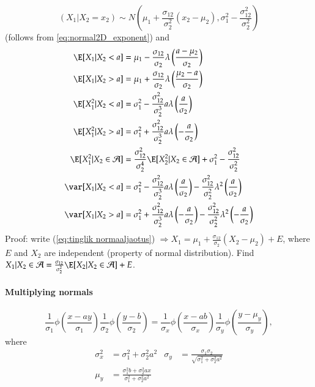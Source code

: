 \documentclass[a4paper]{article}
\numberwithin{equation}{subsection}
\begin{document}
\begin{equation}
  (X_1|X_2 = x_2)
  \sim 
  N\left(\mu_1 + \frac{\sigma_{12}}{\sigma_2^2}(x_2 - \mu_2),
    \sigma_1^2 - \frac{\sigma_{12}^2}{\sigma_2^2}\right)
\label{eq:tinglik normaaljaotus}
\end{equation}
(follows from \ref{eq:normal2D_exponent}) and
\begin{align}
  \E[X_1|X_2 < a] 
  & = 
  \mu_1 - \frac{\sigma_{12}}{\sigma_2}
  \lambda 
  \left( \frac{a - \mu_2}{\sigma_2} \right)
  \label{eq:normal2d_E[X1|X2<a]}
  \\
  \E[X_1|X_2 > a] 
  & = 
  \mu_1 + \frac{\sigma_{12}}{\sigma_2}
  \lambda \left( \frac{\mu_2 - a}{\sigma_2} \right)
  \\
  \E[X_{1}^{2}|X_{2} < a]
  &=
  \sigma_{1}^{2} - \frac{\sigma_{12}^{2}}{\sigma_{2}^{3}}
  a \lambda \left( \frac{a}{\sigma_{2}} \right)
  \\
  \E[X_{1}^{2}|X_{2} > a]
  &=
  \sigma_{1}^{2} + \frac{\sigma_{12}^{2}}{\sigma_{2}^{3}}
  a \lambda \left( -\frac{a}{\sigma_{2}} \right)
  \\
  \E[X_1^2|X_2 \in \mathcal{A}]
  &=
  \frac{\sigma_{12}^2}{\sigma_2^4}
  \E[X_2^2|X_2 \in \mathcal{A}] +
  \sigma_1^2 - \frac{\sigma_{12}^2}{\sigma_2^2}
  \\
  \var[ X_1|X_2 < a]
  & =
  \sigma_{1}^{2} 
  -
  \frac{\sigma_{12}^2}{\sigma_{2}^{3}} a 
  \lambda \left( \frac{a}{\sigma_{2}} \right) 
  - 
  \frac{\sigma_{12}^2}{\sigma_{2}^{2}}  
  \lambda^2 \left( \frac{a}{\sigma_{2}} \right)
  \label{eq:normal_var[X1|X2<a]}
  \\
  \var[ X_1|X_2 > a]
  & =
  \sigma_{1}^{2} 
  +
  \frac{\sigma_{12}^2}{\sigma_{2}^{3}} a 
  \lambda \left(-\frac{a}{\sigma_{2}} \right) 
  - 
  \frac{\sigma_{12}^2}{\sigma_{2}^{2}}  
  \lambda^2 \left(-\frac{a}{\sigma_{2}} \right)
  \label{eq:normal_var[X1|X2>a]}
\end{align}
Proof: write (\ref{eq:tinglik normaaljaotus}) $\Rightarrow X_1 =
\mu_1 + \frac{\sigma_{12}}{\sigma_2}(X_2 - \mu_2) + E$,
where $E$ and $X_2$ are independent (property of normal distribution).  Find $X_1|X_2
\in \mathcal{A} = \frac{\sigma_{12}}{\sigma_2^2} \E[X_2|X_2 \in
\mathcal{A}] + E$.


\paragraph{Multiplying normals}

\begin{equation}
\frac{1}{\sigma_1}\phi\left( \frac{x-ay}{\sigma_1} \right)
  \frac{1}{\sigma_2}\phi\left( \frac{y-b}{\sigma_2} \right) =
%
\frac{1}{\sigma_x}\phi\left( \frac{x-ab}{\sigma_x} \right)
  \frac{1}{\sigma_y}\phi\left( \frac{y-\mu_y}{\sigma_y} \right),
  \label{eq:normaaljaotuste_korrutis}
\end{equation}
where
\begin{align*}
\sigma_x^{2}
&= 
\sigma_1^2 + \sigma_2^2 a^2 
&
        \sigma_y &= \frac{\sigma_1 \sigma_2}
          {\sqrt{\sigma_1^2 + \sigma_2^2 a^2}} \\
\mu_y &=
  \frac{\sigma_1^2 b + \sigma_2^2 a x}{\sigma_1^2 + \sigma_2^2 a^2}
\end{align*}
\end{document}
